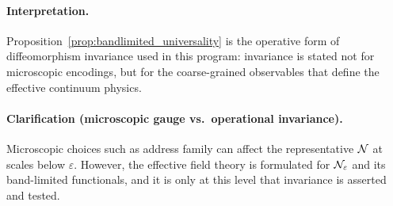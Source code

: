 \paragraph{Interpretation.}
Proposition~\ref{prop:bandlimited_universality} is the operative form of diffeomorphism invariance used in this program: invariance is stated not for microscopic encodings, but for the coarse-grained observables that define the effective continuum physics.

\paragraph{Clarification (microscopic gauge vs.\ operational invariance).}
Microscopic choices such as address family can affect the representative $\mathcal{N}$ at scales below $\varepsilon$.
However, the effective field theory is formulated for $\mathcal{N}_\varepsilon$ and its band-limited functionals, and it is only at this level that invariance is asserted and tested.


